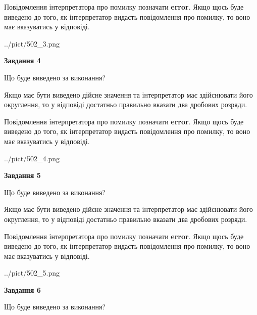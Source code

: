 \documentclass[12pt, ukrainian]{article}
\begin{document}
{\begin {Large}
Повідомлення інтерпретатора про помилку позначати \textbf{error}.
Якщо щось буде виведено до того, як інтерпретатор видасть повідомлення про помилку, 
то воно має вказуватись у відповіді. \par

\begin{center}
	{../pict/502_3.png}
\end{center}
\newpage

{\begin {center}\textbf{Завдання 4}\end {center}}\par
Що буде виведено за виконання? \par

Якщо має бути виведено дійсне значення та інтерпретатор має здійснювати його округлення, 
то у відповіді достатньо правильно вказати два дробових розряди.

Повідомлення інтерпретатора про помилку позначати \textbf{error}.
Якщо щось буде виведено до того, як інтерпретатор видасть повідомлення про помилку, 
то воно має вказуватись у відповіді. \par

\begin{center}
	{../pict/502_4.png}
\end{center}
\newpage

{\begin {center}\textbf{Завдання 5}\end {center}}\par
Що буде виведено за виконання? \par

Якщо має бути виведено дійсне значення та інтерпретатор має здійснювати його округлення, 
то у відповіді достатньо правильно вказати два дробових розряди.

Повідомлення інтерпретатора про помилку позначати \textbf{error}.
Якщо щось буде виведено до того, як інтерпретатор видасть повідомлення про помилку, 
то воно має вказуватись у відповіді. \par

\begin{center}
	{../pict/502_5.png}
\end{center}
\newpage

{\begin {center}\textbf{Завдання 6}\end {center}}\par
Що буде виведено за виконання? \par


\end{Large}}
\end{document}
